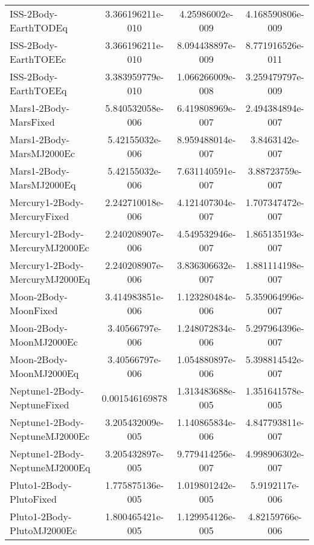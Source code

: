 \begin{table}[htbp!]
\begin{tabular}{lccc}
         ISS-2Body-EarthTODEq & 3.366196211e-010 & 4.25986002e-009 & 4.168590806e-009 \\
         ISS-2Body-EarthTOEEc & 3.366196211e-010 & 8.094438897e-009 & 8.771916526e-011 \\
         ISS-2Body-EarthTOEEq & 3.383959779e-010 & 1.066266009e-008 & 3.259479797e-009 \\
         Mars1-2Body-MarsFixed & 5.840532058e-006 & 6.419808969e-007 & 2.494384894e-007 \\
         Mars1-2Body-MarsMJ2000Ec & 5.42155032e-006 & 8.959488014e-007 & 3.8463142e-007 \\
         Mars1-2Body-MarsMJ2000Eq & 5.42155032e-006 & 7.631140591e-007 & 3.88723759e-007 \\
         Mercury1-2Body-MercuryFixed & 2.242710018e-006 & 4.121407304e-007 & 1.707347472e-007 \\
         Mercury1-2Body-MercuryMJ2000Ec & 2.240208907e-006 & 4.549532946e-007 & 1.865135193e-007 \\
         Mercury1-2Body-MercuryMJ2000Eq & 2.240208907e-006 & 3.836306632e-007 & 1.881114198e-007 \\
         Moon-2Body-MoonFixed & 3.414983851e-006 & 1.123280484e-006 & 5.359064996e-007 \\
         Moon-2Body-MoonMJ2000Ec & 3.40566797e-006 & 1.248072834e-006 & 5.297964396e-007 \\
         Moon-2Body-MoonMJ2000Eq & 3.40566797e-006 & 1.054880897e-006 & 5.398814542e-007 \\
         Neptune1-2Body-NeptuneFixed & 0.001546169878 & 1.313483688e-005 & 1.351641578e-005 \\
         Neptune1-2Body-NeptuneMJ2000Ec & 3.205432009e-005 & 1.140865834e-006 & 4.847793811e-007 \\
         Neptune1-2Body-NeptuneMJ2000Eq & 3.205432897e-005 & 9.779414256e-007 & 4.998906302e-007 \\
         Pluto1-2Body-PlutoFixed & 1.775875136e-005 & 1.019801242e-005 & 5.9192117e-006 \\
         Pluto1-2Body-PlutoMJ2000Ec & 1.800465421e-005 & 1.129954126e-005 & 4.82159766e-006 \\

\end{tabular}
\end{table}
